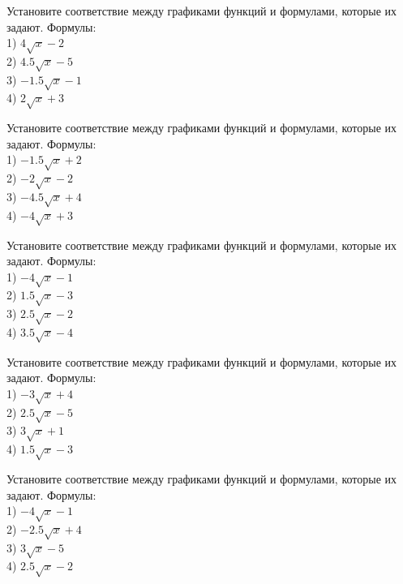 \documentclass[4apaper]{article}
\begin{document}
\begin{taskBN}{61}
Установите соответствие между графиками функций и формулами, которые их задают. Формулы: \\1) $4\sqrt{x}-2$\\2) $4.5\sqrt{x}-5$\\3) $-1.5\sqrt{x}-1$\\4) $2\sqrt{x}+3$
\end{taskBN}

\begin{taskBN}{62}
Установите соответствие между графиками функций и формулами, которые их задают. Формулы: \\1) $-1.5\sqrt{x}+2$\\2) $-2\sqrt{x}-2$\\3) $-4.5\sqrt{x}+4$\\4) $-4\sqrt{x}+3$
\end{taskBN}

\begin{taskBN}{63}
Установите соответствие между графиками функций и формулами, которые их задают. Формулы: \\1) $-4\sqrt{x}-1$\\2) $1.5\sqrt{x}-3$\\3) $2.5\sqrt{x}-2$\\4) $3.5\sqrt{x}-4$
\end{taskBN}

\begin{taskBN}{64}
Установите соответствие между графиками функций и формулами, которые их задают. Формулы: \\1) $-3\sqrt{x}+4$\\2) $2.5\sqrt{x}-5$\\3) $3\sqrt{x}+1$\\4) $1.5\sqrt{x}-3$
\end{taskBN}

\begin{taskBN}{65}
Установите соответствие между графиками функций и формулами, которые их задают. Формулы: \\1) $-4\sqrt{x}-1$\\2) $-2.5\sqrt{x}+4$\\3) $3\sqrt{x}-5$\\4) $2.5\sqrt{x}-2$
\end{taskBN}
\end{document}
